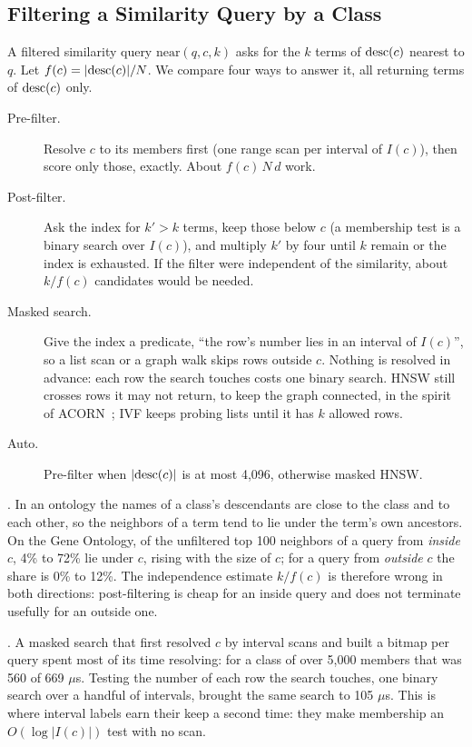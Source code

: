 \subsection{Filtering a Similarity Query by a Class}
\label{sec-hybrid}

A filtered similarity query $\mathrm{near}(q,c,k)$ asks for the $k$ terms of
$\mathrm{desc}(c)$ nearest to $q$.
Let $f(c)=|\mathrm{desc}(c)|/N$.
We compare four ways to answer it, all returning terms of $\mathrm{desc}(c)$ only.
\begin{description}
\item[Pre-filter.] Resolve $c$ to its members first (one range scan per
  interval of $I(c)$), then score only those, exactly. About $f(c)\,N\,d$ work.
\item[Post-filter.] Ask the index for $k'>k$ terms, keep those below $c$ (a
  membership test is a binary search over $I(c)$), and multiply $k'$ by four
  until $k$ remain or the index is exhausted.
  If the filter were independent of the similarity, about $k/f(c)$
  candidates would be needed.
\item[Masked search.] Give the index a predicate, ``the row's number lies in
  an interval of $I(c)$'', so a list scan or a graph walk skips rows outside
  $c$.
  Nothing is resolved in advance: each row the search touches costs one
  binary search.
  HNSW still crosses rows it may not return, to keep the graph connected, in
  the spirit of ACORN~\cite{patel2024}; IVF keeps probing lists until it has
  $k$ allowed rows.
\item[Auto.] Pre-filter when $|\mathrm{desc}(c)|$ is at most 4,096, otherwise masked
  HNSW.
\end{description}

.
In an ontology the names of a class's descendants are close to the class and
to each other, so the neighbors of a term tend to lie under the term's own
ancestors.
On the Gene Ontology, of the unfiltered top 100 neighbors of a query from
\emph{inside} $c$, 4\% to 72\% lie under $c$, rising with the size of $c$; for
a query from \emph{outside} $c$ the share is 0\% to 12\%.
The independence estimate $k/f(c)$ is therefore wrong in both directions:
post-filtering is cheap for an inside query and does not terminate usefully
for an outside one.

.
A masked search that first resolved $c$ by interval scans and built a bitmap
per query spent most of its time resolving: for a class of over 5,000 members
that was 560 of 669 $\mu$s.
Testing the number of each row the search touches, one binary search over a
handful of intervals, brought the same search to 105 $\mu$s.
This is where interval labels earn their keep a second time: they make
membership an $O(\log|I(c)|)$ test with no scan.
